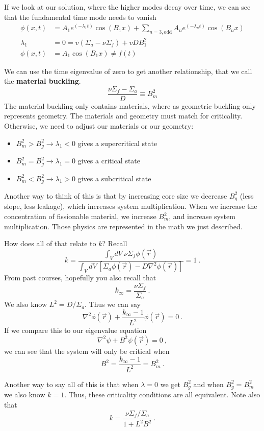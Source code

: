 \documentclass[12pt]{article}
\begin{document}
If we look at our solution, where the higher modes decay over time, we can see that the fundamental time mode needs to vanish
\begin{align*}
\phi(x,t) &= A_1 e^{(-\lambda_1 t)}\cos(B_1 x) + \sum_{n=3,\text{odd}} A_n e^{(-\lambda_n t)} \cos(B_nx)\\
%
\lambda_1 &= 0 = v(\Sigma_a - \nu \Sigma_f) + v D B_1^2\\
%
\phi(x,t) &= A_1 \cos(B_1 x) \neq f(t)
\end{align*}

We can use the time eigenvalue of zero to get another relationship, that we call the \textbf{material buckling}.
\[
\frac{\nu \Sigma_f - \Sigma_a}{D} \equiv B_m^2
\]
The material buckling only contains materials, where as geometric buckling only represents geometry. The materials and geometry must match for criticality. Otherwise, we need to adjust our materials or our geometry:
\begin{itemize}
\item $B_m^2 > B_g^2 \rightarrow \lambda_1 < 0$ gives a supercritical state
\item $B_m^2 = B_g^2 \rightarrow \lambda_1 = 0$ gives a critical state
\item $B_m^2 < B_g^2 \rightarrow \lambda_1 > 0$ gives a subcritical state
\end{itemize}
Another way to think of this is that by increasing core size we decrease $B_g^2$ (less slope, less leakage), which increases system multiplication. When we increase the concentration of fissionable material, we increase $B_m^2$, and increase system multiplication. Those physics are represented in the math we just described. 

How does all of that relate to $k$? Recall
\[
k = \frac{\int_V dV\: \nu \Sigma_f \phi(\vec{r})}{\int_V dV\: [\Sigma_a \phi(\vec{r}) - D \nabla^2 \phi(\vec{r})]} = 1 \:.
\]
From past courses, hopefully you also recall that
\[
k_{\infty} = \frac{\nu \Sigma_f}{\Sigma_a}\:.
\]
We also know $L^2 = D/\Sigma_a$. Thus we can say
\[
\nabla^2 \phi(\vec{r}) + \frac{k_{\infty} - 1}{L^2} \phi(\vec{r}) = 0\:.
\]
If we compare this to our eigenvalue equation
\[
\nabla^2 \psi + B^2 \psi(\vec{r}) = 0\:,
\]
we can see that the system will only be critical when
\[
B^2 = \frac{k_{\infty} - 1}{L^2} = B_m^2 \:.
\]

Another way to say all of this is that when $\lambda = 0$ we get $B_g^2$ and when $B_g^2 = B_m^2$ we also know $k=1$. Thus, these criticality conditions are all equivalent. Note also that 
\[
k = \frac{\nu \Sigma_f/\Sigma_a}{1+ L^2 B^2} \:.
\]
\end{document}

